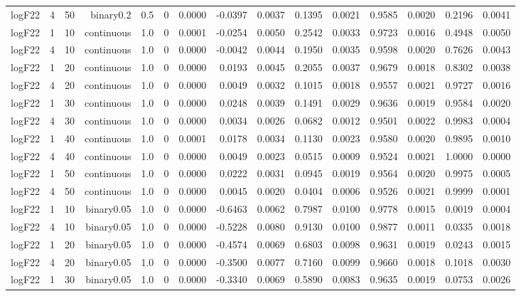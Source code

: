 \begin{longtable}{rrrrrrrrrrrrrrr}
  logF22 & 4 & 50 & binary0.2 & 0.5 & 0 & 0.0000 & -0.0397 & 0.0037 & 0.1395 & 0.0021 & 0.9585 & 0.0020 & 0.2196 & 0.0041 \\ 
  logF22 & 1 & 10 & continuous & 1.0 & 0 & 0.0001 & -0.0254 & 0.0050 & 0.2542 & 0.0033 & 0.9723 & 0.0016 & 0.4948 & 0.0050 \\ 
  logF22 & 4 & 10 & continuous & 1.0 & 0 & 0.0000 & -0.0042 & 0.0044 & 0.1950 & 0.0035 & 0.9598 & 0.0020 & 0.7626 & 0.0043 \\ 
  logF22 & 1 & 20 & continuous & 1.0 & 0 & 0.0000 & 0.0193 & 0.0045 & 0.2055 & 0.0037 & 0.9679 & 0.0018 & 0.8302 & 0.0038 \\ 
  logF22 & 4 & 20 & continuous & 1.0 & 0 & 0.0000 & 0.0049 & 0.0032 & 0.1015 & 0.0018 & 0.9557 & 0.0021 & 0.9727 & 0.0016 \\ 
  logF22 & 1 & 30 & continuous & 1.0 & 0 & 0.0000 & 0.0248 & 0.0039 & 0.1491 & 0.0029 & 0.9636 & 0.0019 & 0.9584 & 0.0020 \\ 
  logF22 & 4 & 30 & continuous & 1.0 & 0 & 0.0000 & 0.0034 & 0.0026 & 0.0682 & 0.0012 & 0.9501 & 0.0022 & 0.9983 & 0.0004 \\ 
  logF22 & 1 & 40 & continuous & 1.0 & 0 & 0.0001 & 0.0178 & 0.0034 & 0.1130 & 0.0023 & 0.9580 & 0.0020 & 0.9895 & 0.0010 \\ 
  logF22 & 4 & 40 & continuous & 1.0 & 0 & 0.0000 & 0.0049 & 0.0023 & 0.0515 & 0.0009 & 0.9524 & 0.0021 & 1.0000 & 0.0000 \\ 
  logF22 & 1 & 50 & continuous & 1.0 & 0 & 0.0000 & 0.0222 & 0.0031 & 0.0945 & 0.0019 & 0.9564 & 0.0020 & 0.9975 & 0.0005 \\ 
  logF22 & 4 & 50 & continuous & 1.0 & 0 & 0.0000 & 0.0045 & 0.0020 & 0.0404 & 0.0006 & 0.9526 & 0.0021 & 0.9999 & 0.0001 \\ 
  logF22 & 1 & 10 & binary0.05 & 1.0 & 0 & 0.0000 & -0.6463 & 0.0062 & 0.7987 & 0.0100 & 0.9778 & 0.0015 & 0.0019 & 0.0004 \\ 
  logF22 & 4 & 10 & binary0.05 & 1.0 & 0 & 0.0000 & -0.5228 & 0.0080 & 0.9130 & 0.0100 & 0.9877 & 0.0011 & 0.0335 & 0.0018 \\ 
  logF22 & 1 & 20 & binary0.05 & 1.0 & 0 & 0.0000 & -0.4574 & 0.0069 & 0.6803 & 0.0098 & 0.9631 & 0.0019 & 0.0243 & 0.0015 \\ 
  logF22 & 4 & 20 & binary0.05 & 1.0 & 0 & 0.0000 & -0.3500 & 0.0077 & 0.7160 & 0.0099 & 0.9660 & 0.0018 & 0.1018 & 0.0030 \\ 
  logF22 & 1 & 30 & binary0.05 & 1.0 & 0 & 0.0000 & -0.3340 & 0.0069 & 0.5890 & 0.0083 & 0.9635 & 0.0019 & 0.0753 & 0.0026 \\ 

\end{longtable}

